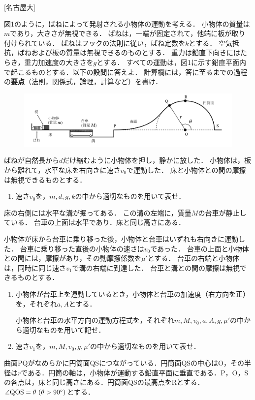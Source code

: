 

\noindent{} [名古屋大]

図1のように，ばねによって発射される小物体の運動を考える．
小物体の質量は$m$であり，大きさが無視できる．
ばねは，一端が固定されて，他端に板が取り付けられている．
ばねはフックの法則に従い，ばね定数を$k$とする．
空気抵抗，ばねおよび板の質量は無視できるのものとする．
重力は鉛直下向きにはたらき，重力加速度の大きさを$g$とする．
すべての運動は，図1に示す鉛直平面内で起こるものとする．以下の設問に答えよ．
計算欄には，答に至るまでの過程の\textbf{要点}（法則，関係式，論理，計算など）を書け．


\begin{figure}[H]
  \centering
  \includegraphics[width=12cm]{fig/fig_1_4.pdf}
\end{figure}

ばねが自然長から$d$だけ縮むように小物体を押し，静かに放した．
小物体は，板から離れて，水平な床を右向きに速さ$v_0$で運動した．
床と小物体との間の摩擦は無視できるものとする．

\begin{enumerate}[label={\textbf{問\arabic*}}]
  \item \hzw 速さ$v_0$を，$m, d, g, k$の中から適切なものを用いて表せ．
\end{enumerate}
床の右側には水平な溝が掘ってある．
この溝の左端に，質量$M$の台車が静止している．
台車の上面は水平であり．床と同じ高さにある．

小物体が床から台車に乗り移った後，小物体と台車はいずれも右向きに運動した．
台車に乗り移った直後の小物体の速さは$v_0$であった．
台車の上面と小物体との間には，摩擦があり，その動摩擦係数を$\mu'$とする．
台車の右端と小物体は，同時に同じ速さ$v_1$で溝の右端に到達した．
台車と溝との間の摩擦は無視できるものとする．
\begin{enumerate}[resume, label={\textbf{問\arabic*}}]
  \item {\hzw}小物体が台車上を運動しているとき，小物体と台車の加速度（右方向を正）を，それぞれ$a, A$とする．
  
  {\hzw}小物体と台車の水平方向の運動方程式を，それぞれ$m, M, v_0, a, A, g, \mu'$の中から適切なものを用いて記せ．

  \item {\hzw}速さ$v_1$を，$m, M, v_0, g, \mu'$の中から適切なものを用いて表せ．
\end{enumerate}
曲面PQがなめらかに円筒面QSにつながっている．円筒面QSの中心はO，その半径は$r$である．円筒の軸は，小物体が運動する鉛直平面に垂直である．P，O，Sの各点は，床と同じ高さにある．円筒面QSの最高点をRとする．$\angle \mathrm{QOS} = \theta \ (\theta > 90{}^\circ)$とする．

